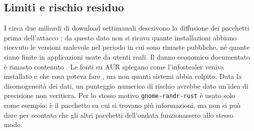 \subsection{Limiti e rischio residuo}
I circa due miliardi di download settimanali descrivono la diffusione dei pacchetti prima dell'attacco \cite{debug2025}: da questo dato non si ricava quante installazioni abbiano ricevuto le versioni malevole nel periodo in cui sono rimaste pubbliche, né quante siano finite in applicazioni usate da utenti reali. Il danno economico documentato è rimasto contenuto \cite{cso2025}. Le fonti su AUR spiegano come l'infostealer veniva installato e che cosa poteva fare \cite{arch-aur-incident-2026,ioctl2026}, ma non quanti sistemi abbia colpito. Data la disomogeneità dei dati, un punteggio numerico di rischio avrebbe dato un'idea di precisione non veritiera. Per lo stesso motivo \texttt{gnome-randr-rust} è usato solo come esempio: è il pacchetto su cui si trovano più informazioni, ma non si può dare per scontato che gli altri pacchetti dell'ondata funzionassero allo stesso modo.